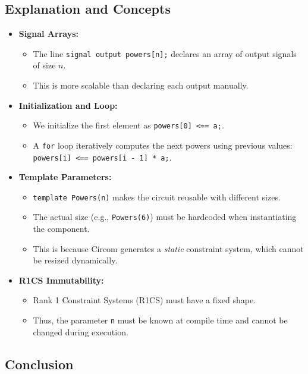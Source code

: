 \documentclass{article}
\begin{document}
\subsection*{Explanation and Concepts}

\begin{itemize}
	\item \textbf{Signal Arrays:} 
	\begin{itemize}
		\item The line \lstinline{signal output powers[n];} declares an array of output signals of size \( n \).
		\item This is more scalable than declaring each output manually.
	\end{itemize}
	
	\item \textbf{Initialization and Loop:}
	\begin{itemize}
		\item We initialize the first element as \lstinline{powers[0] <== a;}.
		\item A \lstinline{for} loop iteratively computes the next powers using previous values: \lstinline{powers[i] <== powers[i - 1] * a;}.
	\end{itemize}
	
	\item \textbf{Template Parameters:}
	\begin{itemize}
		\item \lstinline{template Powers(n)} makes the circuit reusable with different sizes.
		\item The actual size (e.g., \lstinline{Powers(6)}) must be hardcoded when instantiating the component.
		\item This is because Circom generates a \emph{static} constraint system, which cannot be resized dynamically.
	\end{itemize}
	
	\item \textbf{R1CS Immutability:}
	\begin{itemize}
		\item Rank 1 Constraint Systems (R1CS) must have a fixed shape.
		\item Thus, the parameter \lstinline{n} must be known at compile time and cannot be changed during execution.
	\end{itemize}
\end{itemize}

\subsection*{Conclusion}
\end{document}
